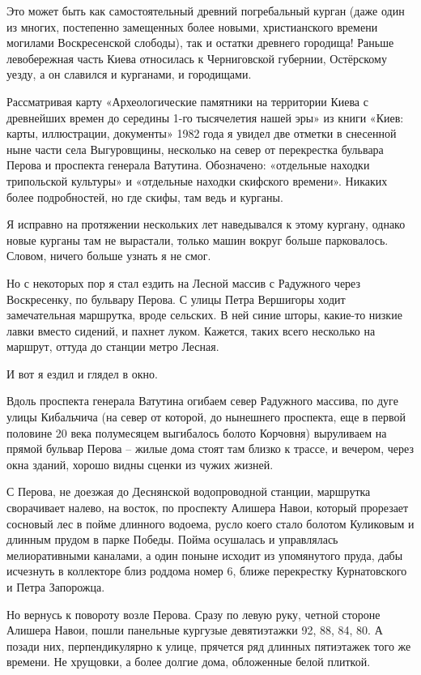 Это может быть как самостоятельный древний погребальный курган (даже один из многих, постепенно замещенных более новыми, христианского времени могилами Воскресенской слободы), так и остатки древнего городища! Раньше левобережная часть Киева относилась к Черниговской губернии, Остёрскому уезду, а он славился и курганами, и городищами.

Рассматривая карту «Археологические памятники на территории Киева с древнейших времен до середины 1-го тысячелетия нашей эры» из книги «Киев: карты, иллюстрации, документы» 1982 года я увидел две отметки в снесенной ныне части села Выгуровщины, несколько на север от перекрестка бульвара Перова и проспекта генерала Ватутина. Обозначено: «отдельные находки трипольской культуры» и «отдельные находки скифского времени». Никаких более подробностей, но где скифы, там ведь и курганы.

Я исправно на протяжении нескольких лет наведывался к этому кургану, однако новые курганы там не вырастали, только машин вокруг больше парковалось. Словом, ничего больше узнать я не смог.

Но с некоторых пор я стал ездить на Лесной массив с Радужного через Воскресенку, по бульвару Перова. С улицы Петра Вершигоры ходит замечательная маршрутка, вроде сельских. В ней синие шторы, какие-то низкие лавки вместо сидений, и пахнет луком. Кажется, таких всего несколько на маршрут, оттуда до станции метро Лесная.

И вот я ездил и глядел в окно. 

Вдоль проспекта генерала Ватутина огибаем север Радужного массива, по дуге улицы Кибальчича (на север от которой, до нынешнего проспекта, еще в первой половине 20 века полумесяцем выгибалось болото Корчовня) выруливаем на прямой бульвар Перова – жилые дома стоят там близко к трассе, и вечером, через окна зданий, хорошо видны сценки из чужих жизней.

С Перова, не доезжая до Деснянской  водопроводной станции, маршрутка сворачивает налево, на восток, по проспекту Алишера Навои, который прорезает сосновый лес в пойме длинного водоема, русло коего стало болотом Куликовым и длинным прудом в парке Победы. Пойма осушалась и управлялась мелиоративными каналами, а один поныне исходит из упомянутого пруда, дабы исчезнуть в коллекторе близ роддома номер 6, ближе перекрестку Курнатовского и Петра Запорожца.

Но вернусь к повороту возле Перова. Сразу по левую руку, четной стороне Алишера Навои, пошли панельные кургузые девятиэтажки 92, 88, 84, 80. А позади них, перпендикулярно к улице, прячется ряд длинных пятиэтажек того же времени. Не хрущовки, а более долгие дома, обложенные белой плиткой.

